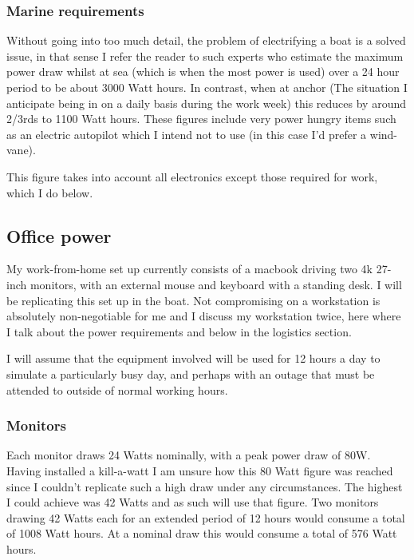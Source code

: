 \subsubsection{Marine requirements}

Without going into too much detail, the problem of electrifying a boat is a solved issue, in that sense I refer the reader to such experts \cite{boat-power-1} \cite{boat-power-2} \cite{boat-power-3} who estimate the maximum power draw whilst at sea (which is when the most power is used) over a 24 hour period to be about 3000 Watt hours. In contrast, when at anchor (The situation I anticipate being in on a daily basis during the work week) this reduces by around 2/3rds to 1100 Watt hours. These figures include very power hungry items such as an electric autopilot which I intend not to use (in this case I'd prefer a wind-vane).

This figure takes into account all electronics except those required for work, which I do below.

\subsection{Office power}

My work-from-home set up currently consists of a macbook driving two 4k 27-inch monitors, with an external mouse and keyboard with a standing desk. I will be replicating this set up in the boat. Not compromising on a workstation is absolutely non-negotiable for me and I discuss my workstation twice, here where I talk about the power requirements and below in the logistics section.

I will assume that the equipment involved will be used for 12 hours a day to simulate a particularly busy day, and perhaps with an outage that must be attended to outside of normal working hours.

\subsubsection{Monitors}
Each monitor draws 24 Watts nominally, with a peak power draw of 80W. Having installed a kill-a-watt I am unsure how this 80 Watt figure was reached since I couldn't replicate such a high draw under any circumstances. The highest I could achieve was 42 Watts and as such will use that figure. Two monitors drawing 42 Watts each for an extended period of 12 hours would consume a total of 1008 Watt hours. At a nominal draw this would consume a total of 576 Watt hours.

